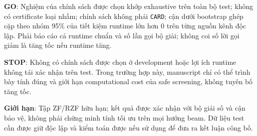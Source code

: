\documentclass[11pt,onecolumn]{IEEEtran}
\begin{document}
\textbf{GO}: Nghiệm của chính sách được chọn khớp exhaustive trên toàn bộ test; không có certificate loại nhầm; chính sách không phải \texttt{CARD}; cận dưới bootstrap ghép cặp theo nhóm 95\% của tiết kiệm runtime lớn hơn 0 trên từng nguồn kênh độc lập. Phải báo cáo cả runtime chuẩn và số lần gọi bộ giải; không coi số lời gọi giảm là tăng tốc nếu runtime tăng.

\textbf{STOP}: Không có chính sách được chọn ở development hoặc lợi ích runtime không tái xác nhận trên test. Trong trường hợp này, manuscript chỉ có thể trình bày tính đúng và giới hạn computational cost của safe screening, không tuyên bố tăng tốc.

\textbf{Giới hạn}: Tập ZF/RZF hữu hạn; kết quả được xác nhận với bộ giải số và cận bảo vệ, không phải chứng minh tính tối ưu trên mọi hướng beam. Dữ liệu test cần được giữ độc lập và kiểm toán được nếu sử dụng để đưa ra kết luận công bố.
\end{document}
